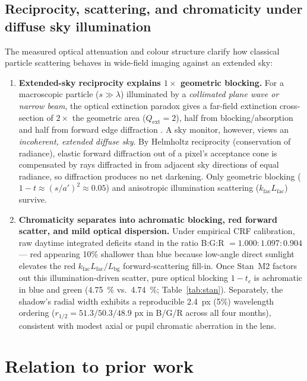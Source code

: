\documentclass[11pt,a4paper]{article}
\newcommand{\Lbg}{L_{\mathrm{bg}}}
\newcommand{\Lfac}{L_{\mathrm{fac}}}
\begin{document}
\subsection{Reciprocity, scattering, and chromaticity under diffuse sky illumination}
\label{sec:reciprocity}

The measured optical attenuation and colour structure clarify how classical particle
scattering behaves in wide-field imaging against an extended sky:
\begin{enumerate}
\item \textbf{Extended-sky reciprocity explains $1\times$ geometric blocking.}
  For a macroscopic particle ($s \gg \lambda$) illuminated by a \emph{collimated plane
  wave or narrow beam}, the optical extinction paradox gives a far-field extinction
  cross-section of $2\times$ the geometric area ($Q_{\mathrm{ext}} = 2$), half from
  blocking/absorption and half from forward edge diffraction
  \citep{vandehulst1981light,bohren1983absorption,berg2011extinction,deepak1978forward,lai2004beam,markel2020extinction}.
  A sky monitor, however, views an \emph{incoherent, extended diffuse sky}. By
  Helmholtz reciprocity (conservation of radiance), elastic forward diffraction out of
  a pixel's acceptance cone is compensated by rays diffracted in from adjacent sky
  directions of equal radiance, so diffraction produces no net darkening. Only
  geometric blocking ($1 - t \approx (s/a')^2 \approx 0.05$) and anisotropic
  illumination scattering ($k_{\mathrm{fac}}\Lfac$) survive.
\item \textbf{Chromaticity separates into achromatic blocking, red forward scatter, and
  mild optical dispersion.} Under empirical CRF calibration, raw daytime integrated
  deficits stand in the ratio B:G:R $= 1.000 : 1.097 : 0.904$ --- red appearing 10\%
  shallower than blue because low-angle direct sunlight elevates the red
  $k_{\mathrm{fac}}\Lfac/\Lbg$ forward-scattering fill-in. Once Stan~M2 factors out
  this illumination-driven scatter, pure optical blocking $1 - t_c$ is achromatic in
  blue and green (\SI{4.75}{\percent} vs.\ \SI{4.74}{\percent}; Table~\ref{tab:stan}).
  Separately, the shadow's radial width exhibits a reproducible \SI{2.4}{px} (5\%)
  wavelength ordering ($r_{1/2} = 51.3 / 50.3 / 48.9\text{ px}$ in B/G/R across all
  four months), consistent with modest axial or pupil chromatic aberration in the lens.
\end{enumerate}

\section{Relation to prior work}
\label{sec:literature}
\end{document}
